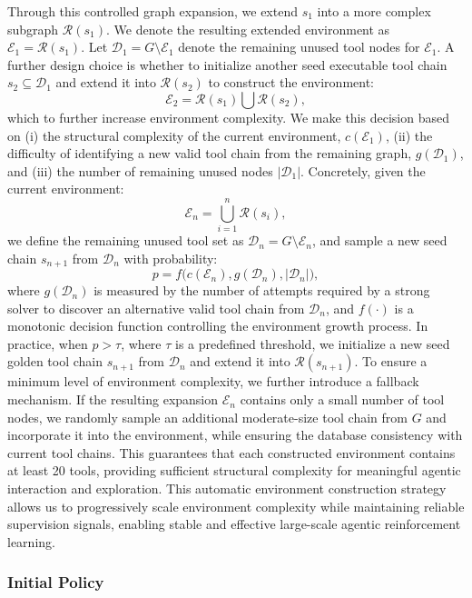 \documentclass{article}
\begin{document}
Through this controlled graph expansion, we extend $s_1$ into a more complex subgraph $\mathcal{R}(s_1)$. We denote the resulting extended environment as $\mathcal{E}_1 = \mathcal{R}(s_1)$.
Let $\mathcal{D}_1 = G \setminus \mathcal{E}_1$ denote the remaining unused tool nodes for $\mathcal{E}_1$.
A further design choice is whether to initialize another seed executable tool chain $s_2 \subseteq \mathcal{D}_1$ and extend it into $\mathcal{R}(s_2)$ to construct the environment:
\[
\mathcal{E}_{2} = \mathcal{R}(s_1) \bigcup \mathcal{R}(s_2),
\]
which to further increase environment complexity.
We make this decision based on (i) the structural complexity of the current environment, $c(\mathcal{E}_{1})$, (ii) the difficulty of identifying a new valid tool chain from the remaining graph, $g(\mathcal{D}_1)$, and (iii) the number of remaining unused nodes $|\mathcal{D}_1|$.
Concretely, given the current environment:
\[
\mathcal{E}_{n} = \bigcup_{i=1}^{n} \mathcal{R}(s_i),
\]
we define the remaining unused tool set as $\mathcal{D}_n = G \setminus \mathcal{E}_n$,
and sample a new seed chain $s_{n+1}$ from $\mathcal{D}_n$ with probability:
\[
p = f\big(c(\mathcal{E}_n), g(\mathcal{D}_n), \lvert \mathcal{D}_n \rvert\big),
\]
where $g(\mathcal{D}_n)$ is measured by the number of attempts required by a strong solver to discover an alternative valid tool chain from $\mathcal{D}_n$, and $f(\cdot)$ is a monotonic decision function controlling the environment growth process. 
In practice, when $p > \tau$, where $\tau$ is a predefined threshold, we initialize a new seed golden tool chain $s_{n+1}$ from $\mathcal{D}_n$ and extend it into $\mathcal{R}(s_{n+1})$.
To ensure a minimum level of environment complexity, we further introduce a fallback mechanism.
If the resulting expansion $\mathcal{E}_n$ contains only a small number of tool nodes, we randomly sample an additional moderate-size tool chain from $G$ and incorporate it into the environment, while ensuring the database consistency with current tool chains.
This guarantees that each constructed environment contains at least 20 tools, providing sufficient structural complexity for meaningful agentic interaction and exploration.
This automatic environment construction strategy allows us to progressively scale environment complexity while maintaining reliable supervision signals, enabling stable and effective large-scale agentic reinforcement learning.


\subsubsection{Initial Policy}
\label{sec:post_training_cold_start}
\end{document}
